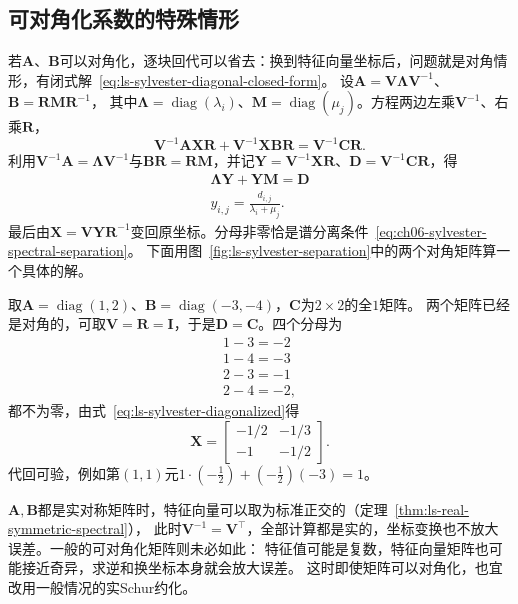 \subsection{可对角化系数的特殊情形}
\label{sec:ls-sylvester-diagonalizable}

若$\bm A$、$\bm B$可以对角化，逐块回代可以省去：换到特征向量坐标后，问题就是对角情形，有闭式解~\eqref{eq:ls-sylvester-diagonal-closed-form}。
设$\bm A=\bm V\bm\Lambda\bm V^{-1}$、$\bm B=\bm R\bm M\bm R^{-1}$，
其中$\bm\Lambda=\operatorname{diag}(\lambda_i)$、$\bm M=\operatorname{diag}(\mu_j)$。方程两边左乘$\bm V^{-1}$、右乘$\bm R$，
\[
 \bm V^{-1}\bm A\bm X\bm R+\bm V^{-1}\bm X\bm B\bm R=\bm V^{-1}\bm C\bm R .
\]
利用$\bm V^{-1}\bm A=\bm\Lambda\bm V^{-1}$与$\bm B\bm R=\bm R\bm M$，并记$\bm Y=\bm V^{-1}\bm X\bm R$、$\bm D=\bm V^{-1}\bm C\bm R$，得
\begin{equation}
\begin{gathered}
\bm\Lambda\bm Y+\bm Y\bm M=\bm D\\
y_{i,j}=\frac{d_{i,j}}{\lambda_i+\mu_j}.
\end{gathered}
\label{eq:ls-sylvester-diagonalized}
\end{equation}
最后由$\bm X=\bm V\bm Y\bm R^{-1}$变回原坐标。分母非零恰是谱分离条件~\eqref{eq:ch06-sylvester-spectral-separation}。
下面用图~\ref{fig:ls-sylvester-separation}中的两个对角矩阵算一个具体的解。

\begin{example}[对角Sylvester方程的闭式解]
\label{ex:ls-sylvester-diagonal}
取$\bm A=\operatorname{diag}(1,2)$、$\bm B=\operatorname{diag}(-3,-4)$，$\bm C$为$2\times2$的全$1$矩阵。
两个矩阵已经是对角的，可取$\bm V=\bm R=\bm I$，于是$\bm D=\bm C$。四个分母为
\[
 \begin{gathered}
1-3=-2\\
1-4=-3\\
2-3=-1\\
2-4=-2,
 \end{gathered}
\]
都不为零，由式~\eqref{eq:ls-sylvester-diagonalized}得
\[
 \bm X=\begin{bmatrix}-1/2&-1/3\\-1&-1/2\end{bmatrix}.
\]
代回可验，例如第$(1,1)$元$1\cdot(-\tfrac12)+(-\tfrac12)(-3)=1$。
\end{example}

$\bm A,\bm B$都是实对称矩阵时，特征向量可以取为标准正交的（定理~\ref{thm:ls-real-symmetric-spectral}），
此时$\bm V^{-1}=\bm V^\top$，全部计算都是实的，坐标变换也不放大误差。一般的可对角化矩阵则未必如此：
特征值可能是复数，特征向量矩阵也可能接近奇异，求逆和换坐标本身就会放大误差。
这时即使矩阵可以对角化，也宜改用一般情况的实Schur约化。

